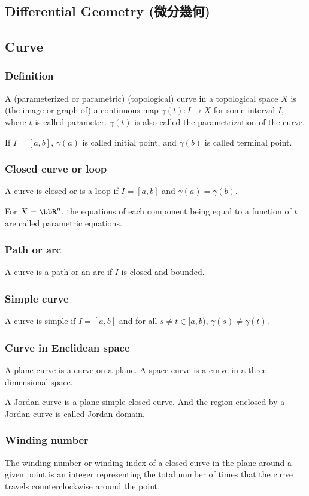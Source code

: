 \documentclass[a4paper,12pt]{report}
\begin{document}
\begin{itemize}
\begin{itemize}
\section{Differential Geometry (微分幾何)}
\subsection{Curve}
\subsubsection{Definition}
A (parameterized or parametric) (topological) curve in a topological space $X$ is (the image or graph of) a continuous map $\gamma(t)\colon I\to X$ for some interval $I$, where $t$ is called parameter. $\gamma(t)$ is also called the parametrization of the curve.

If $I=[a,b]$, $\gamma(a)$ is called initial point, and $\gamma(b)$ is called terminal point.
\subsubsection{Closed curve or loop}
A curve is closed or is a loop if $I=[a,b]$ and $\gamma(a)=\gamma(b)$.

For $X=\bbR^n$, the equations of each component being equal to a function of $t$ are called parametric equations.
\subsubsection{Path or arc}
A curve is a path or an arc if $I$ is closed and bounded.
\subsubsection{Simple curve}
A curve is simple if $I=[a,b]$ and for all $s\neq t\in[a,b)$, $\gamma(s)\neq\gamma(t)$.
\subsubsection{Curve in Enclidean space}
A plane curve is a curve on a plane. A space curve is a curve in a three-dimensional space.

A Jordan curve is a plane simple closed curve. And the region enclosed by a Jordan curve is called Jordan domain.
\subsubsection{Winding number}
The winding number or winding index of a closed curve in the plane around a given point is an integer representing the total number of times that the curve travels counterclockwise around the point.

\end{itemize}
\end{itemize}
\end{document}
